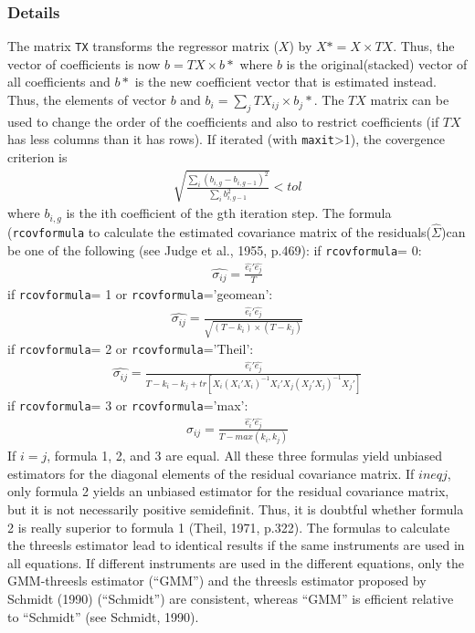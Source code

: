 \subsubsection{Details}
The matrix \texttt{TX} transforms the regressor matrix ($X$) by $X\ast=X \times TX$. Thus,
the vector of coefficients is now $b=TX \times b\ast$ where $b$ is the original(stacked) 
vector of all coefficients and $b\ast$ is the new coefficient vector that is estimated instead.
Thus, the elements of vector $b$ and $b_i = \sum_j TX_{ij}\times b_j\ast$. The $TX$ matrix can be
used to change the order of the coefficients and also to restrict coefficients (if $TX$ has 
less columns than it has rows). 
If iterated (with \texttt{maxit}>1), the covergence criterion is
\begin{eqnarray*}
\sqrt{\frac{\sum_i(b_{i,g}-b_{i,g-1})^2}{\sum_ib_{i,g-1}^2}} < tol
\end{eqnarray*}
where $b_{i,g}$ is the ith coefficient of the gth iteration step.
The formula (\texttt{rcovformula} to calculate the estimated covariance matrix of the residuals($\hat{\Sigma}$)can be one
of the following (see Judge et al., 1955, p.469):
if \texttt{rcovformula}= 0:
\begin{eqnarray*}
\hat{\sigma_{ij}}= \frac{\hat{e_i}\prime\hat{e_j}}{T}
\end{eqnarray*}
if \texttt{rcovformula}= 1 or \texttt{rcovformula}='geomean':
\begin{eqnarray*}
\hat{\sigma_{ij}}= \frac{\hat{e_i}\prime\hat{e_j}}{\sqrt{(T-k_i)\times (T-k_j)}}
\end{eqnarray*}
if \texttt{rcovformula}= 2 or \texttt{rcovformula}='Theil':
\begin{eqnarray*}
\hat{\sigma_{ij}}= \frac{\hat{e_i}\prime\hat{e_j}}{T-k_i-k_j+tr[X_i(X_i\prime X_i)^{-1}X_i\prime X_j(X_j\prime X_j)^{-1}X_j\prime]}
\end{eqnarray*}
if \texttt{rcovformula}= 3 or \texttt{rcovformula}='max':
\begin{eqnarray*}
\hat{\sigma_{ij}}= \frac{\hat{e_i}\prime\hat{e_j}}{T-max(k_i,k_j)}
\end{eqnarray*}
If $i = j$, formula 1, 2, and 3 are equal. All these three formulas yield unbiased estimators
for the diagonal elements of the residual covariance matrix. If $i neq j$, only formula 2
yields an unbiased estimator for the residual covariance matrix, but it is not necessarily
positive semidefinit. Thus, it is doubtful whether formula 2 is really superior to formula 1
(Theil, 1971, p.322).
The formulas to calculate the threesls estimator lead to identical results 
if the same instruments are used in all equations. If different instruments 
are used in the different equations, only the GMM-threesls estimator (``GMM'') 
and the threesls estimator proposed by Schmidt (1990) (``Schmidt'') are consistent, whereas 
``GMM'' is efficient relative to ``Schmidt'' (see Schmidt, 1990).
